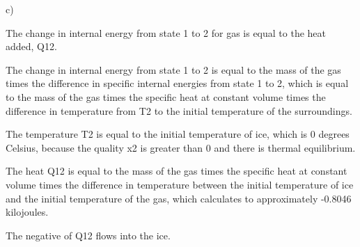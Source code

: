 c)

The change in internal energy from state 1 to 2 for gas is equal to the heat added, Q12.

The change in internal energy from state 1 to 2 is equal to the mass of the gas times the difference in specific internal energies from state 1 to 2, which is equal to the mass of the gas times the specific heat at constant volume times the difference in temperature from T2 to the initial temperature of the surroundings.

The temperature T2 is equal to the initial temperature of ice, which is 0 degrees Celsius, because the quality x2 is greater than 0 and there is thermal equilibrium.

The heat Q12 is equal to the mass of the gas times the specific heat at constant volume times the difference in temperature between the initial temperature of ice and the initial temperature of the gas, which calculates to approximately -0.8046 kilojoules.

The negative of Q12 flows into the ice.